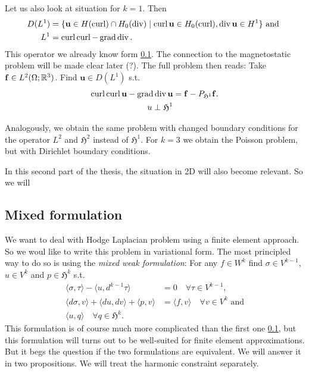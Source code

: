 \documentclass[../master_thesis.tex]{subfiles}
\begin{document}
Let us also look at situation for $k=1$. Then 
\begin{align*}
    D(L^1) &= \{ \mathbf{u} \in H(\operatorname{curl}) \cap H_0(\operatorname{div}) 
        \mid \operatorname{curl} \mathbf{u} \in H_0(\operatorname{curl}), \operatorname{div} \mathbf{u} \in H^1 \} \text{ and }
    \\ L^1 &= \operatorname{curl} \operatorname{curl} - \operatorname{grad} \operatorname{div}.
\end{align*}
This operator we already know form \ref{}. The connection to the magnetostatic problem 
will be made clear later (?). The full problem then reads: Take $\mathbf{f} \in L^2(\Omega;\mathbb{R}^3)$. 
Find $\mathbf{u} \in D(L^1)$ s.t. 
\begin{align*}
    \operatorname{curl} \operatorname{curl} \mathbf{u} - \operatorname{grad} \operatorname{div} \mathbf{u} &= \mathbf{f} - P_{\mathfrak{H}^1}\mathbf{f}.
    \\ u \perp \mathfrak{H}^1
\end{align*}

Analogously, we obtain the same problem with changed boundary conditions for the operator $L^2$ 
and $\mathfrak{H}^2$ instead of $\mathfrak{H}^1$. For $k=3$ we obtain the Poisson problem, 
but with Dirichlet boundary conditions.

In this second part of the thesis, the situation in 2D will also become relevant. So we will

\subsection{Mixed formulation}
We want to deal with Hodge Laplacian problem using a finite element approach. 
So we woul like to write this problem in variational form. The most principled way to do so 
is using the \textit{mixed weak formulation}: For any $f \in W^k$ find $\sigma \in V^{k-1}$, 
$u\in V^k$ and $p\in \mathfrak{H}^k$ s.t.
\begin{align}
    \langle \sigma, \tau \rangle - \langle u, d^{k-1}\tau \rangle 
        &= 0 \quad \forall \tau \in V^{k-1}, \label{eq:first_eq_mixed_formulation}
    \\ \langle d\sigma, v \rangle + \langle du, dv \rangle + \langle p, v \rangle 
        &= \langle f, v \rangle \quad \forall v \in V^k \text{ and} \label{eq:second_eq_mixed_formulation}
    \\ \langle u, q \rangle \quad \forall q \in \mathfrak{H}^k.
\end{align} 
This formulation is of course much more complicated than the first one \ref{}, 
but this formulation will turns out to be well-suited for finite element approximations.
But it begs the question if the two formulations are equivalent. We will answer it 
in two propositions. We will treat the harmonic constraint separately.
\end{document}
